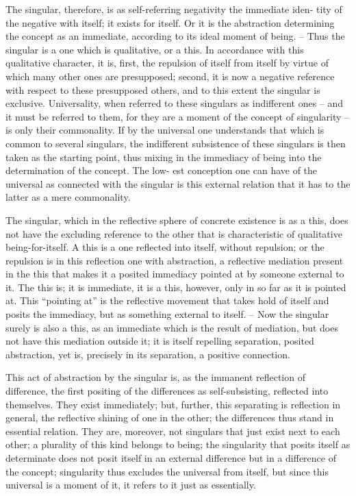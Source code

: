 The singular, therefore, is as self-referring negativity the immediate iden-
tity of the negative with itself; it exists for itself. Or it is the abstraction
determining the concept as an immediate, according to its ideal moment of
being. – Thus the singular is a one which is qualitative, or a this.
In accordance with this qualitative character, it is, first, the repulsion of itself from
itself by virtue of which many other ones are presupposed; second, it is now
a negative reference with respect to these presupposed others, and to this
extent the singular is exclusive. Universality, when referred to these singulars
as indifferent ones – and it must be referred to them, for they are a moment
of the concept of singularity – is only their commonality. If by the universal
one understands that which is common to several singulars, the indifferent
subsistence of these singulars is then taken as the starting point, thus mixing
in the immediacy of being into the determination of the concept. The low-
est conception one can have of the universal as connected with the singular
is this external relation that it has to the latter as a mere commonality.

The singular, which in the reflective sphere of concrete existence is as a
this, does not have the excluding reference to the other that is characteristic
of qualitative being-for-itself. A this is a one reflected into itself, without
repulsion; or the repulsion is in this reflection one with abstraction, a
reflective mediation present in the this that makes it a posited immediacy
pointed at by someone external to it. The this is; it is immediate, it is a
this, however, only in so far as it is pointed at. This “pointing at” is the
reflective movement that takes hold of itself and posits the immediacy, but
as something external to itself. – Now the singular surely is also a this,
as an immediate which is the result of mediation, but does not have this
mediation outside it; it is itself repelling separation, posited abstraction, yet
is, precisely in its separation, a positive connection.

This act of abstraction by the singular is, as the immanent reflection
of difference, the first positing of the differences as self-subsisting, reflected
into themselves. They exist immediately; but, further, this separating is
reflection in general, the reflective shining of one in the other; the differences
thus stand in essential relation. They are, moreover, not singulars that
just exist next to each other; a plurality of this kind belongs to being; the
singularity that posits itself as determinate does not posit itself in an external
difference but in a difference of the concept; singularity thus excludes the
universal from itself, but since this universal is a moment of it, it refers to
it just as essentially.

